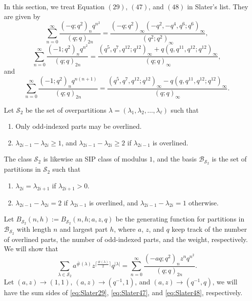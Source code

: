 \documentclass[11pt]{amsart}
\theoremstyle{definition}
\theoremstyle{remark}
\numberwithin{equation}{section}
\begin{document}
In this section, we treat Equation $(29)$, $(47)$, and $(48)$ in Slater's list. They are given by
\begin{equation}\label{eq:Slater29}
\sum_{n=0}^{\infty}\frac{(-q;q^2)_{n}q^{n^2}}{(q;q)_{2n}}
=\dfrac{(-q;q^2)_{\infty}(-q^2,-q^4,q^6;q^6)_{\infty}}{(q^2;q^2)_{\infty}},
\end{equation}
\begin{equation}\label{eq:Slater47}
\sum_{n=0}^{\infty}\frac{(-1;q^2)_nq^{n^2}}{(q;q)_{2n}}
=\frac{(q^5,q^7,q^{12};q^{12})_{\infty}+q(q,q^{11},q^{12};q^{12})_{\infty}}{(q;q)_{\infty}},
\end{equation}
and
\begin{equation}\label{eq:Slater48}
\sum_{n=0}^{\infty}\frac{(-1;q^2)_nq^{n(n+1)}}{(q;q)_{2n}}
=\frac{(q^5,q^7,q^{12};q^{12})_{\infty}-q(q,q^{11},q^{12};q^{12})_{\infty}}{(q;q)_{\infty}}.
\end{equation}

Let $\mathcal{S}_2$ be the set of overpartitions $\lambda=(\lambda_1,\lambda_2,\ldots,\lambda_\ell)$ such that
\begin{enumerate}
    \item Only odd-indexed parts may be overlined.
    \item $\lambda_{2i-1}-\lambda_{2i}\geq1$, and $\lambda_{2i-1}-\lambda_{2i}\geq2$ if $\lambda_{2i-1}$ is overlined.
\end{enumerate}

The class $\mathcal{S}_2$ is likewise an SIP class of modulus $1$, and the basis $\mathcal{B}_{\mathcal{S}_2}$ is the set of partitions in $\mathcal{S}_2$ such that
\begin{enumerate}
    \item $\lambda_{2i}=\lambda_{2i+1}$ if $\lambda_{2i+1}>0$.
    \item $\lambda_{2i-1}-\lambda_{2i}=2$ if $\lambda_{2i-1}$ is overlined, and $\lambda_{2i-1}-\lambda_{2i}=1$ otherwise.
\end{enumerate}
Let $B_{\mathcal S_2}(n,h):=B_{\mathcal S_2}(n,h;a,z,q)$ be the generating function for partitions in $\mathcal{B}_{\mathcal{S}_2}$ with length $n$ and largest part $h$, where $a$, $z$, and $q$ keep track of the number of overlined parts, the number of odd-indexed parts, and the weight, respectively. We will show that
$$\sum_{\lambda\in\mathcal{S}_2}a^{\overline{\#}(\lambda)}z^{\lceil\frac{\#(\lambda)}{2}\rceil}q^{|\lambda|}=\sum_{n=0}^{\infty}\frac{(-aq;q^2)_{n}z^nq^{n^2}}{(q;q)_{2n}}.$$
Let $(a,z)\to(1,1)$, $(a,z)\to(q^{-1},1)$, and $(a,z)\to(q^{-1},q)$, we will have the sum sides of \eqref{eq:Slater29}, \eqref{eq:Slater47}, and \eqref{eq:Slater48}, respectively.
\end{document}
